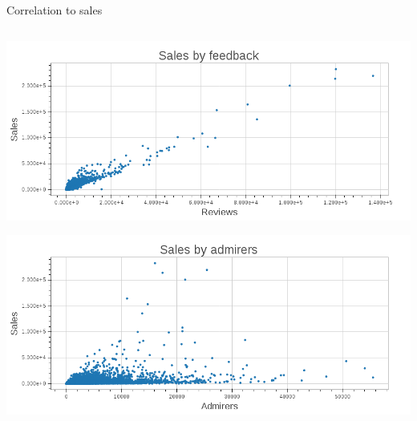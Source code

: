 \begin{frame}[fragile]{Correlation to sales}
    \begin{columns}
     \begin{column}{.49\textwidth}
        \begin{center}
            \includegraphics[scale=.18]{images/scatter_feedback}
        \end{center}
        \newline{}
        \begin{center}
            \includegraphics[scale=.18]{images/scatter_admirers}
        \end{center}
     \end{column}
    

\end{columns}
\end{frame}
